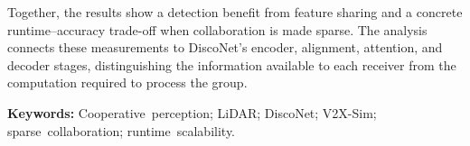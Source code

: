 \documentclass[11pt,a4paper]{article}
\newcommand{\cleartorecto}{%
  \clearpage
  \ifodd\value{page}\else
    \hbox{}\thispagestyle{empty}\newpage
  \fi}
\begin{document}
Together, the results show a detection benefit from feature sharing and a
concrete runtime--accuracy trade-off when collaboration is made sparse.
The analysis connects these measurements to DiscoNet's encoder, alignment,
attention, and decoder stages, distinguishing the information available to
each receiver from the computation required to process the group.
\par
\medskip
\begingroup
\raggedright
\noindent\textbf{Keywords:} Cooperative~perception; LiDAR; DiscoNet; V2X-Sim;
sparse~collaboration; runtime~scalability.
\par
\endgroup
\endgroup
\clearpage
\begingroup
\small
\setlength{\parskip}{0pt}
\tableofcontents
\endgroup
\clearpage
{}
{}
\listoffigures
\cleartorecto
{}







\cleartorecto
\appendix

\cleartorecto
{}
{}
\begingroup
\small\raggedright
\def\UrlBigBreaks{\do\-}


\endgroup
\end{document}
